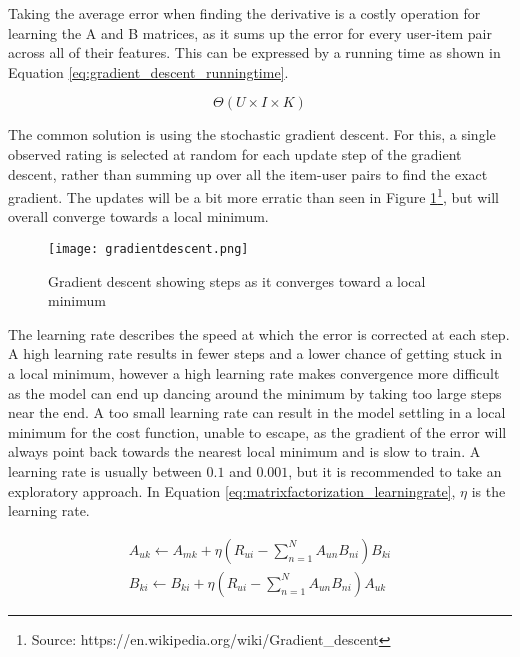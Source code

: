 Taking the average error when finding the derivative is a costly operation for learning the A and B matrices, as it sums up the error for every user-item pair across all of their features. This can be expressed by a running time as shown in Equation \ref{eq:gradient_descent_runningtime}.

\begin{equation}\label{eq:gradient_descent_runningtime}
	\Theta(U\times I \times K)
\end{equation}

The common solution is using the stochastic gradient descent. For this, a single observed rating is selected at random for each update step of the gradient descent, rather than summing up over all the item-user pairs to find the exact gradient. The updates will be a bit more erratic than seen in Figure \ref{fig:gradientDescent}\footnote{Source: https://en.wikipedia.org/wiki/Gradient\_descent\label{ftn:wikifigure}}, but will overall converge towards a local minimum.

\begin{figure}
	\centering
	\texttt{[image: gradientdescent.png]}
	\caption{Gradient descent showing steps as it converges toward a local minimum}
	\label{fig:gradientDescent}
\end{figure}

The learning rate describes the speed at which the error is corrected at each step. A high learning rate results in fewer steps and a lower chance of getting stuck in a local minimum, however a high learning rate makes convergence more difficult as the model can end up dancing around the minimum by taking too large steps near the end. A too small learning rate can result in the model settling in a local minimum for the cost function, unable to escape, as the gradient of the error will always point back towards the nearest local minimum and is slow to train. A learning rate is usually between $0.1$ and $0.001$, but it is recommended to take an exploratory approach. In Equation \ref{eq:matrixfactorization_learningrate}, $\eta$ is the learning rate.

\begin{equation}\label{eq:matrixfactorization_learningrate}
	\begin{split}
	A_{uk}\leftarrow A_{mk} + \eta(R_{ui}-\sum_{n=1}^{N}A_{un}B_{ni})B_{ki}
	\\
	B_{ki}\leftarrow B_{ki} + \eta(R_{ui}-\sum_{n=1}^{N}A_{un}B_{ni})A_{uk}
	\end{split}
\end{equation}

